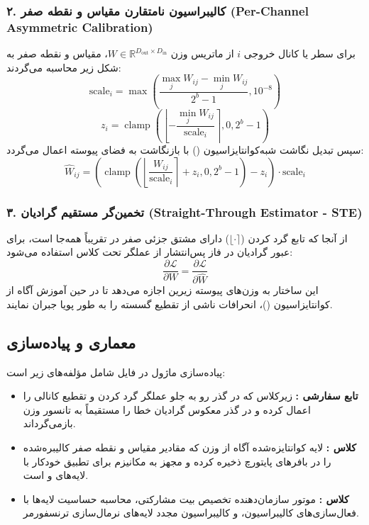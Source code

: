 \subsubsection*{۲. کالیبراسیون نامتقارن مقیاس و نقطه صفر (Per-Channel Asymmetric Calibration)}
برای سطر یا کانال خروجی $i$ از ماتریس وزن $W \in \mathbb{R}^{D_{\text{out}} \times D_{\text{in}}}$، مقیاس و نقطه صفر به شکل زیر محاسبه می‌گردند:
\begin{equation}
\text{scale}_i = \max\left( \frac{\max_j W_{ij} - \min_j W_{ij}}{2^b - 1}, 10^{-8} \right)
\end{equation}
\begin{equation}
z_i = \operatorname{clamp}\left( \left\lfloor -\frac{\min_j W_{ij}}{\text{scale}_i} \right\rceil, 0, 2^b - 1 \right)
\end{equation}
سپس تبدیل نگاشت شبه‌کوانتایزاسیون () با بازنگاشت به فضای پیوسته اعمال می‌گردد:
\begin{equation}
\widehat{W}_{ij} = \left( \operatorname{clamp}\left( \left\lfloor \frac{W_{ij}}{\text{scale}_i} \right\rceil + z_i, 0, 2^b - 1 \right) - z_i \right) \cdot \text{scale}_i
\end{equation}

\subsubsection*{۳. تخمین‌گر مستقیم گرادیان (Straight-Through Estimator - STE)}
از آنجا که تابع گرد کردن ($\lfloor \cdot \rceil$) دارای مشتق جزئی صفر در تقریباً همه‌جا است، برای عبور گرادیان در فاز پس‌انتشار از عملگر  تحت کلاس  استفاده می‌شود:
\begin{equation}
\frac{\partial \mathcal{L}}{\partial W} = \frac{\partial \mathcal{L}}{\partial \widehat{W}}
\end{equation}
این ساختار به وزن‌های پیوسته زیرین اجازه می‌دهد تا در حین آموزش آگاه از کوانتایزاسیون ()، انحرافات ناشی از تقطیع گسسته را به طور پویا جبران نمایند.

\subsection{معماری و پیاده‌سازی}
پیاده‌سازی ماژول در فایل  شامل مؤلفه‌های زیر است:
\begin{itemize}
    \item \textbf{تابع سفارشی :} زیرکلاس  که در گذر رو به جلو عملگر گرد کردن و تقطیع کانالی را اعمال کرده و در گذر معکوس گرادیان خطا را مستقیماً به تانسور وزن بازمی‌گرداند.
    \item \textbf{کلاس :} لایه کوانتایزه‌شده آگاه از وزن که مقادیر مقیاس و نقطه صفر کالیبره‌شده را در بافرهای پایتورچ ذخیره کرده و مجهز به مکانیزم  برای تطبیق خودکار با لایه‌های  و  است.
    \item \textbf{کلاس :} موتور سازمان‌دهنده تخصیص بیت مشارکتی، محاسبه حساسیت لایه‌ها با فعال‌سازی‌های کالیبراسیون، و کالیبراسیون مجدد لایه‌های نرمال‌سازی ترنسفورمر.
\end{itemize}

